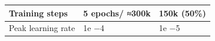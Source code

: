 \begin{tabular}{lll}
\toprule
Training steps & 5 epochs/ ≈300k & 150k (50\%) \\
\midrule
Peak learning rate & 1e −4 & 1e −5 \\
\bottomrule
\end{tabular}
